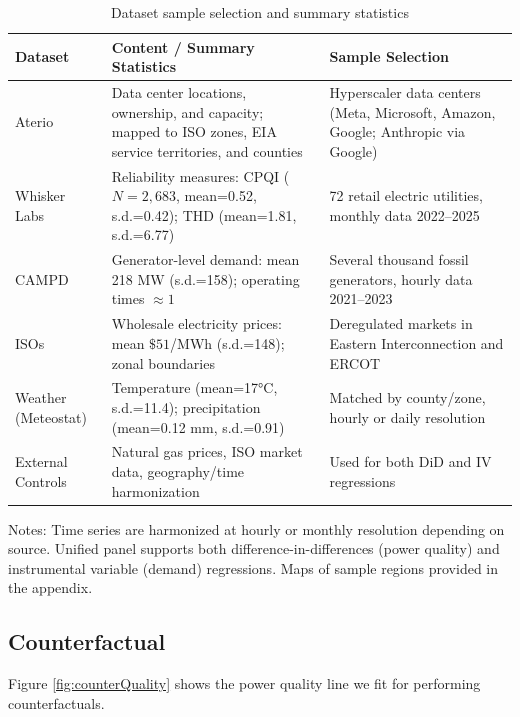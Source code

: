 \documentclass[sigconf,authordraft]{acmart}
\begin{document}
\begin{table}
\centering
\small
\caption{Dataset sample selection and summary statistics}
\label{tab:SampleSelection}
\begin{threeparttable}
\begin{tabularx}{\linewidth}{lXl}
\toprule
\textbf{Dataset} & \textbf{Content / Summary Statistics} & \textbf{Sample Selection} \\
\midrule
Aterio & Data center locations, ownership, and capacity; mapped to ISO zones, EIA service territories, and counties & Hyperscaler data centers (Meta, Microsoft, Amazon, Google; Anthropic via Google) \\
\midrule
Whisker Labs & Reliability measures: CPQI ($N=2{,}683$, mean=0.52, s.d.=0.42); THD (mean=1.81, s.d.=6.77) & 72 retail electric utilities, monthly data 2022--2025 \\
\midrule
CAMPD & Generator-level demand: mean 218 MW (s.d.=158); operating times $\approx 1$ & Several thousand fossil generators, hourly data 2021--2023 \\
\midrule
ISOs & Wholesale electricity prices: mean $\$51$/MWh (s.d.=148); zonal boundaries & Deregulated markets in Eastern Interconnection and ERCOT \\
\midrule
Weather (Meteostat) & Temperature (mean=17°C, s.d.=11.4); precipitation (mean=0.12 mm, s.d.=0.91) & Matched by county/zone, hourly or daily resolution \\
\midrule
External Controls & Natural gas prices, ISO market data, geography/time harmonization & Used for both DiD and IV regressions \\
\bottomrule
\end{tabularx}
\begin{tablenotes}
\footnotesize
\item Notes: Time series are harmonized at hourly or monthly resolution depending on source. Unified panel supports both difference-in-differences (power quality) and instrumental variable (demand) regressions. Maps of sample regions provided in the appendix.
\end{tablenotes}
\end{threeparttable}
\end{table}
\newpage

\subsection{Counterfactual}
Figure \ref{fig:counterQuality} shows the power quality line we fit for performing counterfactuals.
\end{document}
